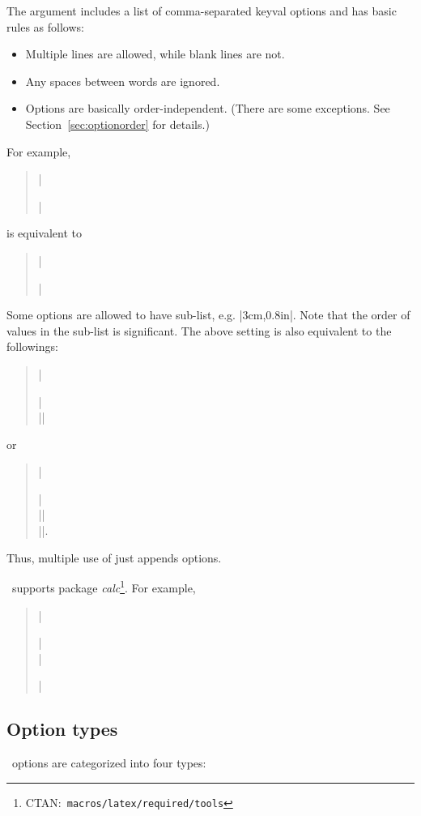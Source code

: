 The argument includes a list of comma-separated \textsf{keyval}
options and has basic rules as follows:
\begin{itemize}\setlength{\itemsep}{-.5\parsep}
\item Multiple lines are allowed, while blank lines are not.
\item Any spaces between words are ignored.
\item Options are basically order-independent.
(There are some exceptions. See Section~\ref{sec:optionorder} for details.)
\end{itemize}
 For example,
\begin{quote}
|\usepackage[ a5paper ,  hmargin = { 3cm,|\\
|                .8in } , height|\\
|         =  10in ]{geometry}|
\end{quote}
is equivalent to 
\begin{quote}
  |\usepackage[height=10in,a5paper,hmargin={3cm,0.8in}]{geometry}|
\end{quote}
Some options are allowed to have sub-list, e.g. |{3cm,0.8in}|.
Note that the order of values in the sub-list is significant.
The above setting is also equivalent to the followings:
\begin{quote}
  |\usepackage{geometry}|\\
  ||
\end{quote}
or 
\begin{quote}
  |\usepackage[a5paper]{geometry}|\\
  ||\\
  |\geometry{height=10in}|.
\end{quote}
Thus, multiple use of  just appends options.

\Gm\ supports package 
\textsl{calc}\footnote{CTAN:~\texttt{macros/latex/required/tools}}.
For example,
\begin{quote}
  |\usepackage{calc}|\\
  |\usepackage[textheight=20\baselineskip+10pt]{geometry}|
\end{quote}

\subsection{Option types}
\Gm\ options are categorized into four types:

